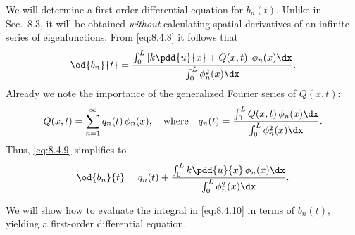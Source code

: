 We will determine a first-order differential equation for $b_n(t)$.  Unlike in Sec.~8.3, it will be obtained \emph{without} calculating spatial derivatives of an infinite series of eigenfunctions.  From \eqref{eq:8.4.8} it follows that
\begin{equation}
\label{eq:8.4.9}
\od{b_n}{t} = \frac{\int_0^L \left[k\pdd{u}{x} + Q(x,t)\right]\phi_n(x)\dx}{\int_0^L \phi_n^2(x)\dx}.
\end{equation}
Already we note the importance of the generalized Fourier series of $Q(x,t)$:
\[
Q(x,t) = \sum_{n=1}^{\infty} q_n(t)\,\phi_n(x),\quad\text{where}\quad
q_n(t) = \frac{\int_0^L Q(x,t)\,\phi_n(x)\dx}{\int_0^L \phi_n^2(x)\dx}.
\]
Thus, \eqref{eq:8.4.9} simplifies to
\begin{equation}
\label{eq:8.4.10}
\od{b_n}{t} = q_n(t) + \frac{\int_0^L k\pdd{u}{x}\,\phi_n(x)\dx}{\int_0^L \phi_n^2(x)\dx}.
\end{equation}

We will show how to evaluate the integral in \eqref{eq:8.4.10} in terms of $b_n(t)$, yielding a first-order differential equation.

